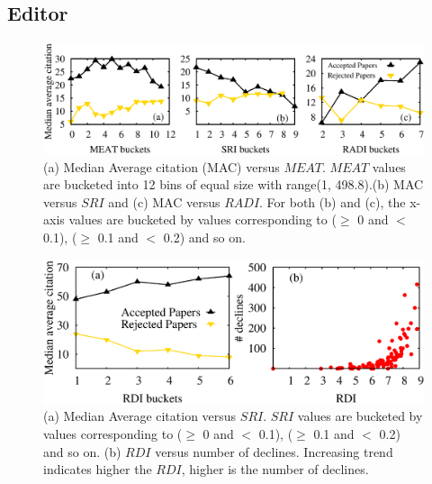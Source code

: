 %

\subsection{Editor}
\label{editor}   

\begin{figure}
\centering
\includegraphics[width=.9\textwidth]{./texfiles/Chapter_4/cikm/figures/editor_all.eps}
\caption{\label{fig3}(a) Median Average citation (MAC) versus $MEAT$. $MEAT$ values are bucketed into 12 bins of equal size with range(1, 498.8).(b) MAC versus $SRI$ and (c) MAC versus $RADI$. For both (b) and (c), the x-axis values are bucketed by values corresponding to ($\geq$ 0 and $<$ 0.1), ($\geq$ 0.1 and $<$ 0.2) and so on.}
\end{figure}

\begin{figure}[!ht]
\centering
\includegraphics[scale=0.4]{./texfiles/Chapter_4/cikm/figures/RDI_RDI_diversity.eps}
\caption{\label{fig_sri} (a) Median Average citation versus $SRI$. $SRI$ values are bucketed by values corresponding to ($\geq$ 0 and $<$ 0.1), ($\geq$ 0.1 and $<$ 0.2) and so on. (b) $RDI$ versus number of declines. Increasing trend indicates higher the $RDI$, higher is the number of declines.}
\end{figure}


